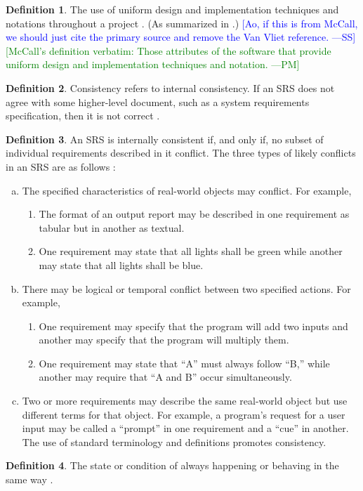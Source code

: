 \documentclass[letterpaper,cleveref]{lipics-v2019}
\newcommand{\authornote}[3]{\textcolor{#1}{[#3 ---#2]}}
\newcommand{\authornote}[3]{}
\newcommand{\wss}[1]{\authornote{blue}{SS}{#1}} %
\newcommand{\pmi}[1]{\authornote{green}{PM}{#1}} %
\theoremstyle{definition}
\newtheorem{defn}{Definition}
\begin{document}
\begin{defn}
  The use of uniform design and implementation techniques and notations
  throughout a project \citep{McCallEtAl1977}. (As summarized in
  \citet{VanVliet2000}.)  \wss{Ao, if this is from McCall, we should just cite
    the primary source and remove the Van Vliet reference.} \pmi{McCall's definition verbatim: Those attributes of the software that provide uniform design and implementation techniques and notation.}
\end{defn}

\begin{defn}
Consistency refers to internal consistency. If an SRS does not agree with some
higher-level document, such as a system requirements specification, then it is
not correct \citep{IEEE1998}.
\end{defn}
\begin{defn}
An SRS is internally consistent if, and only if, no subset of individual
requirements described in it conflict. The three types of likely conflicts in an
SRS are as follows \citep{IEEE1998}:
	\begin{enumerate}[a)]
\item The specified characteristics of real-world objects may conflict. For
example,
	\begin{enumerate}[1)]
\item The format of an output report may be described in one requirement as
tabular but in another as textual.
\item One requirement may state that all lights shall be green while another may
state that all lights shall be blue.
	\end{enumerate}
\item There may be logical or temporal conflict between two specified actions.
For example,
	\begin{enumerate}[1)]
\item One requirement may specify that the program will add two inputs and
another may specify that the program will multiply them.
\item One requirement may state that “A” must always follow “B,” while another
may require that “A and B” occur simultaneously.
	\end{enumerate}
\item Two or more requirements may describe the same real-world object but use
different terms for that object. For example, a program’s request for a user
input may be called a “prompt” in one requirement and a “cue” in another. The
use of standard terminology and definitions promotes consistency.
	\end{enumerate}
\end{defn}
\begin{defn}
The state or condition of always happening or behaving in the same way
\citep{CambridgeConsistency2019}.
\end{defn}
\end{document}
